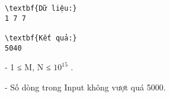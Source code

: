 \begin{verbatim}
\textbf{Dữ liệu:}
1 7 7

\textbf{Kết quả:}
5040
\end{verbatim}
- 1 ≤ M, N ≤ $10^{15}$   .   


   - Số dòng trong Input không vượt quá 5000.